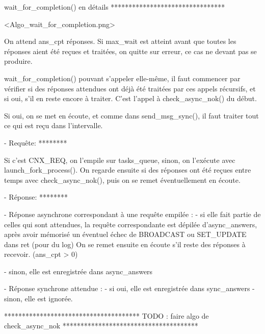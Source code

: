 wait_for_completion() en détails
********************************

<Algo_wait_for_completion.png>

On attend ans_cpt réponses. Si max_wait est atteint avant que toutes les réponses aient été reçues
et traitées, on quitte sur erreur, ce cas ne devant pas se produire.

wait_for_completion() pouvant s'appeler elle-même, il faut commencer par vérifier si des réponses
attendues ont déjà été traitées par ces appels récursifs, et si oui, s'il en reste encore à traiter.
C'est l'appel à check_async_nok() du début.

Si oui, on se met en écoute, et comme dans send_msg_sync(), il faut traiter tout ce qui est reçu
dans l'intervalle.

- Requête:
  ********

  Si c'est CNX_REQ, on l'empile sur tasks_queue, sinon, on l'exécute avec launch_fork_process().
  On regarde ensuite si des réponses ont été reçues entre temps avec check_async_nok(), puis on se
  remet éventuellement en écoute.

- Réponse:
  ********

  - Réponse asynchrone correspondant à une requête empilée :
    - si elle fait partie de celles qui sont attendues, la requête correspondante est dépilée
    d'async_answers, après avoir mémorisé un éventuel échec de BROADCAST ou SET_UPDATE dans ret
    (pour du log)
    On se remet ensuite en écoute s'il reste des réponses à recevoir. (ans_cpt > 0)

    - sinon, elle est enregistrée dans async_answers

  - Réponse synchrone attendue :
    - si oui, elle est enregistrée dans sync_answers
    - sinon, elle est ignorée.


**************************************
TODO : faire algo de check_async_nok
**************************************
